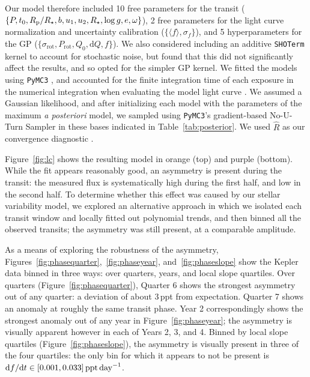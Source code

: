 \documentclass[12pt,modern,twocolumn,tighten]{aastex63}
\begin{document}
Our model therefore included 10 free parameters for the transit ($\{P,
t_0, R_{\rm p}/R_\star, b, u_1 ,u_2 ,R_\star, \log g, e, \omega \}$),
2 free parameters for the light curve normalization and uncertainty
calibration ($\{\langle f \rangle, \sigma_f \}$), and 5
hyperparameters for the GP ($\{\sigma_{\mathrm{rot}},
P_{\mathrm{rot}}, Q_0, \mathrm{d}Q, f \}$).  We also considered
including an additive \texttt{SHOTerm} kernel to account for
stochastic noise, but found that this did not significantly affect the
results, and so opted for the simpler GP kernel.  We fitted the models
using \texttt{PyMC3} \citep{salvatier_2016_PyMC3,exoplanet:theano},
and accounted for the finite integration time of each exposure in the
numerical integration when evaluating the model light curve
\citep[see][]{kipping_binning_2010}.  We assumed a Gaussian
likelihood, and after initializing each model with the parameters of
the maximum {\it a posteriori} model, we sampled using
\texttt{PyMC3}'s gradient-based No-U-Turn Sampler
\citep{hoffman_no-u-turn_2014} in these bases indicated in
Table~\ref{tab:posterior}.  We used $\hat{R}$ as our convergence
diagnostic \citep{gelman_inference_1992}.

Figure~\ref{fig:lc} shows the resulting model in orange (top) and
purple (bottom).  While the fit appears reasonably good, an asymmetry
is present during the transit: the measured flux is systematically
high during the first half, and low in the second half.  To determine
whether this effect was caused by our stellar variability model, we 
explored an alternative approach in which we isolated each transit
window and locally fitted out polynomial trends, and then binned all
the observed transits; the asymmetry was still present, at a
comparable amplitude.

As a means of exploring the robustness of the asymmetry,
Figures~\ref{fig:phasequarter},~\ref{fig:phaseyear},
and~\ref{fig:phaseslope} show the Kepler data binned in three ways:
over quarters, years, and local slope quartiles.  Over quarters
(Figure~\ref{fig:phasequarter}), Quarter 6 shows the strongest asymmetry
out of any quarter: a deviation of about 3\,ppt from expectation.
Quarter 7 shows an anomaly at roughly the same transit phase.  Year 2
correspondingly shows the strongest anomaly out of any year in
Figure~\ref{fig:phaseyear}; the asymmetry is visually apparent however
in each of Years 2, 3, and 4.
Binned by local slope quartiles (Figure~\ref{fig:phaseslope}), the
asymmetry is visually present in three of the four quartiles: the only
bin for which it appears to not be present is ${\rm d}f/{\rm
d}t\in[0.001,0.033]\,{\rm ppt\,day}^{-1}$.
\end{document}
